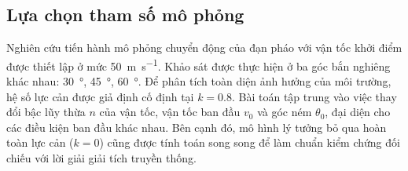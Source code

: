 \subsection{Lựa chọn tham số mô phỏng}

Nghiên cứu tiến hành mô phỏng chuyển động của đạn pháo với vận tốc khởi điểm được thiết lập ở mức \qty{50}{\meter\per\second}. Khảo sát được thực hiện ở ba góc bắn nghiêng khác nhau: \qty{30}{\degree}, \qty{45}{\degree}, \qty{60}{\degree}.
Để phân tích toàn diện ảnh hưởng của môi trường, hệ số lực cản được giả định cố định tại \(k = 0.8\). Bài toán tập trung vào việc thay đổi bậc lũy thừa \(n\) của vận tốc, vận tốc ban đầu \(v_0\) và góc ném \(\theta_0\), đại diện cho các điều kiện ban đầu khác nhau. Bên cạnh đó, mô hình lý tưởng bỏ qua hoàn toàn lực cản ($k = 0$) cũng được tính toán song song để làm chuẩn kiểm chứng đối chiếu với lời giải giải tích truyền thống.
